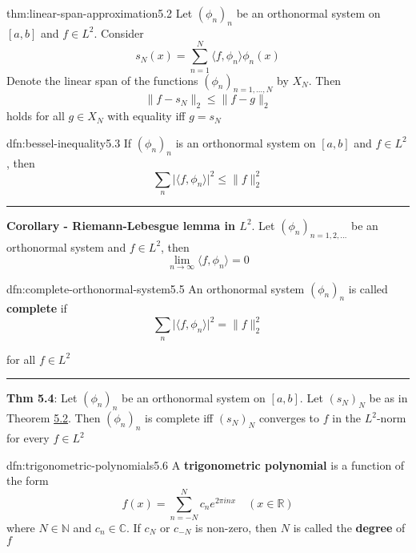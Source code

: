 \documentclass[landscape, 8pt]{extarticle}
\begin{document}
\begin{multicols}{3}
\begin{thm}[]{thm:linear-span-approximation}{5.2}
	Let $(\phi_{n})_{n}$ be an orthonormal system on $[a, b]$ and $f\in L^{2}$. Consider
	\[s_{N}(x) = \sum_{n = 1}^{N}\langle f, \phi_{n} \rangle \phi_{n}(x)\]
	Denote the linear span of the functions $(\phi_{n})_{n=1,\dots,N}$ by $X_{N}$. Then
	\[\lVert f - s_{N} \rVert_{2} \le \lVert f - g \rVert_{2}\]
	holds for all $g\in X_{N}$ with equality iff $g = s_{N}$
\end{thm}

\vspace{-5pt}
\begin{dfn}{dfn:bessel-inequality}{5.3}
	\vspace{-5pt}
	If $(\phi_{n})_{n}$ is an orthonormal system on $[a,b]$ and $f\in L^{2}$, then
	\[\sum_{n} \lvert \langle f, \phi_{n} \rangle \rvert^{2} \le \lVert f \rVert^{2}_{2}\]

	\noindent\rule{\textwidth}{0.2pt}
	\textbf{Corollary - Riemann-Lebesgue lemma in $L^{2}$}. Let $(\phi_{n})_{n=1,2,\dots}$ be an orthonormal system and $f\in L^{2}$, then
	\[\lim_{n\to \infty}\langle f, \phi_{n} \rangle = 0\]
\end{dfn}

\vspace{-5pt}
\begin{dfn}{dfn:complete-orthonormal-system}{5.5}
	\vspace{-5pt}
	An orthonormal system $(\phi_{n})_{n}$ is called \textbf{complete} if
	\[\sum_{n} \lvert \langle f, \phi_{n} \rangle \rvert^{2} = \lVert f \rVert^{2}_{2}\]

	\vspace{-2pt}
	for all $f\in L^{2}$
	
	\vspace{-5pt}
	\noindent\rule{\textwidth}{0.2pt}
	\textbf{Thm 5.4}: Let $(\phi_{n})_{n}$ be an orthonormal system on $[a, b]$. Let $(s_{N})_{N}$ be as in Theorem \hyperref[dfn:inner-prod]{5.2}. Then $(\phi_{n})_{n}$ is complete iff $(s_{N})_{N}$ converges to $f$ in the $L^{2}$-norm for every $f\in L^{2}$
\end{dfn}

\vspace{-5pt}
\begin{dfn}{dfn:trigonometric-polynomials}{5.6}
	A \textbf{trigonometric polynomial} is a function of the form
	\[f(x) = \sum_{n = -N}^{N} c_{n} e^{2 \pi inx} \quad (x\in\mathbb{R})\]
	where $N\in\mathbb{N}$ and $c_{n}\in\mathbb{C}$. If $c_{N}$ or $c_{-N}$ is non-zero, then $N$ is called the \textbf{degree} of $f$


\end{dfn}
\end{multicols}
\end{document}
